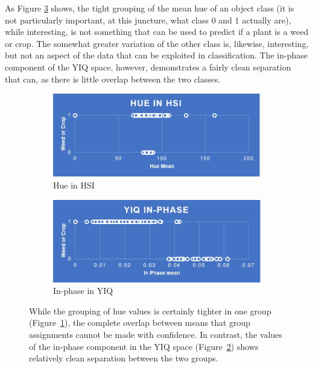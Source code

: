 \documentclass[letterpaper]{article}
\begin{document}
{As Figure \ref{fig:hue_vs_inphase} shows, the tight grouping of the mean hue of an object class (it is not particularly important, at this juncture, what class $0$ and $1$ actually are), while interesting, is not something that can be used to predict if a plant is a weed or crop.  The somewhat greater variation of the other class is, likewise, interesting, but not an aspect of the data that can be exploited in classification. The in-phase component of the YIQ space, however, demonstrates a fairly clean separation that can, as there is little overlap between the two classes.


\begin{figure}[H]
	\begin{subfigure}[h]{0.48\linewidth}
		\includegraphics[width=1\linewidth]{./figures/hsi-hue.jpg}
		\caption{Hue in HSI}
		\label{subfig:hue}	
	\end{subfigure}
	\hfill
	\begin{subfigure}[h]{0.48\linewidth}
		\includegraphics[width=1\linewidth]{./figures/yiq-in-phase.jpg}
		\caption{In-phase in YIQ}
		\label{subfig:in_phase}		
	\end{subfigure}%
	\caption[Prediction using hue in HSI and In-phase in YIQ]{While the grouping of hue values is certainly tighter in one group (Figure~\ref{subfig:hue}), the complete overlap between means that group assignments cannot be made with confidence. In contrast, the values of the in-phase component in the YIQ space (Figure~\ref{subfig:in_phase}) shows relatively clean separation between the two groups.}
	\label{fig:hue_vs_inphase}
\end{figure}

}
\end{document}
